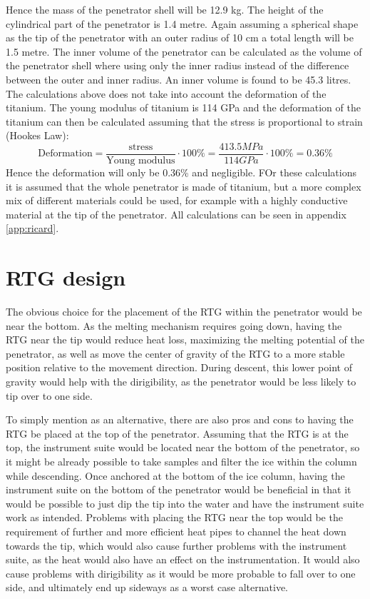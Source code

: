 Hence the mass of the penetrator shell will be 12.9 kg. The height of the cylindrical part of the penetrator is 1.4 metre. Again assuming a spherical shape as the tip of the penetrator with an outer radius of 10 cm a total length will be 1.5 metre. The inner volume of the penetrator can be calculated as the volume of the penetrator shell where using only the inner radius instead of the difference between the outer and inner radius. An inner volume is found to be 45.3 litres. The calculations above does not take into account the deformation of the titanium. The young modulus of titanium is 114 GPa and the deformation of the titanium can then be calculated assuming that the stress is proportional to strain (Hookes Law): 
\begin{equation}
\text{Deformation} = \frac{\text{stress}}{\text{Young modulus}}\cdot 100\% = \frac{413.5MPa}{114GPa} \cdot 100\% = 0.36\%
\end{equation}
Hence the deformation will only be 0.36\% and negligible. FOr these calculations it is assumed that the whole penetrator is made of titanium, but a more complex mix of different materials could be used, for example with a highly conductive material at the tip of the penetrator. All calculations can be seen in appendix \ref{app:ricard}. 


\section{RTG design}\label{sec:rtg}

The obvious choice for the placement of the RTG within the penetrator would be near the bottom. As the melting mechanism requires going down, having the RTG near the tip would reduce heat loss, maximizing the melting potential of the penetrator, as well as move the center of gravity of the RTG to a more stable position relative to the movement direction. During descent, this lower point of gravity would help with the dirigibility, as the penetrator would be less likely to tip over to one side.

To simply mention as an alternative, there are also pros and cons to having the RTG be placed at the top of the penetrator. Assuming that the RTG is at the top, the instrument suite would be located near the bottom of the penetrator, so it might be already possible to take samples and filter the ice within the column while descending. Once anchored at the bottom of the ice column, having the instrument suite on the bottom of the penetrator would be beneficial in that it would be possible to just dip the tip into the water and have the instrument suite work as intended. Problems with placing the RTG near the top would be the requirement of further and more efficient heat pipes to channel the heat down towards the tip, which would also cause further problems with the instrument suite, as the heat would also have an effect on the instrumentation. It would also cause problems with dirigibility as it would be more probable to fall over to one side, and ultimately end up sideways as a worst case alternative. 

